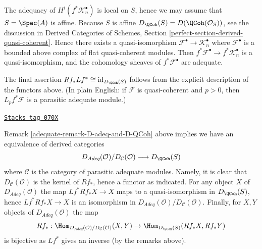 \begin{remark}
\medskip\noindent
The adequacy of $H^i(f^*\mathcal{K}_n^\bullet)$ is local on $S$, hence
we may assume that $S = \Spec(A)$ is affine. Because $S$ is affine
$D_\QCoh(S) = D(\QCoh(\mathcal{O}_S))$, see
the discussion in
Derived Categories of Schemes, Section
\ref{perfect-section-derived-quasi-coherent}.
Hence there exists a quasi-isomorphism
$\mathcal{F}^\bullet \to \mathcal{K}_n^\bullet$
where $\mathcal{F}^\bullet$ is a bounded above complex of flat
quasi-coherent modules.
Then $f^*\mathcal{F}^\bullet \to f^*\mathcal{K}_n^\bullet$ is a
quasi-isomorphism, and the cohomology sheaves of
$f^*\mathcal{F}^\bullet$ are adequate.

\medskip\noindent
The final assertion
$Rf_* Lf^* \cong \text{id}_{D_\QCoh(S)}$
follows from the explicit description of the functors above.
(In plain English: if $\mathcal{F}$ is quasi-coherent and $p > 0$, then
$L_pf^*\mathcal{F}$ is a parasitic adequate module.)
\end{remark}


\begin{remark}[Conclusion]
\label{adequate-remark-conclusion}
\href{https://stacks.math.columbia.edu/tag/070X}{\texttt{Stacks tag 070X}}

Remark \ref{adequate-remark-D-adeq-and-D-QCoh}
above implies we have an equivalence of derived categories
$$
D_{\textit{Adeq}}(\mathcal{O})/D_\mathcal{C}(\mathcal{O})
\longrightarrow
D_\QCoh(S)
$$
where $\mathcal{C}$ is the category of parasitic adequate modules.
Namely, it is clear that $D_\mathcal{C}(\mathcal{O})$ is the kernel
of $Rf_*$, hence a functor as indicated. For any object $X$ of
$D_{\textit{Adeq}}(\mathcal{O})$ the map $Lf^*Rf_*X \to X$ maps
to a quasi-isomorphism in $D_\QCoh(S)$, hence
$Lf^*Rf_*X \to X$ is an isomorphism in
$D_{\textit{Adeq}}(\mathcal{O})/D_\mathcal{C}(\mathcal{O})$.
Finally, for $X, Y$ objects of $D_{\textit{Adeq}}(\mathcal{O})$
the map
$$
Rf_* :
\Hom_{D_{\textit{Adeq}}(\mathcal{O})/D_\mathcal{C}(\mathcal{O})}(X, Y)
\to
\Hom_{D_\QCoh(S)}(Rf_*X, Rf_*Y)
$$
is bijective as $Lf^*$ gives an inverse (by the remarks above).
\end{remark}



